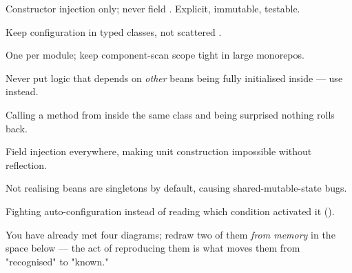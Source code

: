 \begin{bestpractices}
\begin{wbitem}
  \item Constructor injection only; never field . Explicit, immutable, testable.
  \item Keep configuration in typed  classes, not scattered .
  \item One  per module; keep component-scan scope tight in large monorepos.
  \item Never put logic that depends on \emph{other} beans being fully initialised inside  — use  instead.
\end{wbitem}
\end{bestpractices}
\begin{mistakes}
\begin{wbitem}
  \item Calling a  method from inside the same class and being surprised nothing rolls back.
  \item Field injection everywhere, making unit construction impossible without reflection.
  \item Not realising beans are singletons by default, causing shared-mutable-state bugs.
  \item Fighting auto-configuration instead of reading which condition activated it ().
\end{wbitem}
\end{mistakes}


You have already met four diagrams; redraw two of them \emph{from memory} in the space below — the act of reproducing them is what moves them from "recognised" to "known."

\begin{writespace}
\end{writespace}

\begin{writespace}
\end{writespace}


